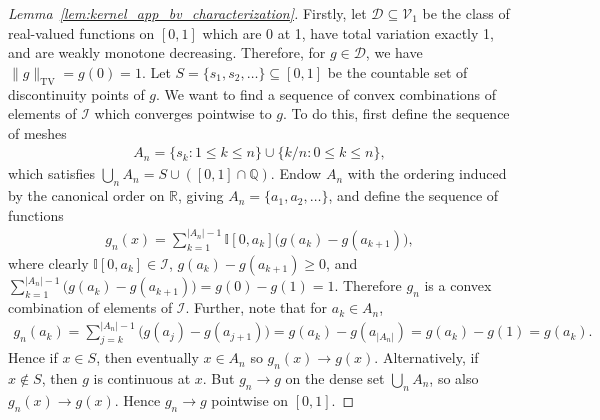 \documentclass[11pt,lof]{puthesis}
\newcommand{\R}{\ensuremath{\mathbb{R}}}
\newcommand{\Q}{\ensuremath{\mathbb{Q}}}
\newcommand{\I}{\ensuremath{\mathbb{I}}}
\newcommand{\TV}{\mathrm{TV}}
\newcommand{\cV}{\ensuremath{\mathcal{V}}}
\newcommand{\cD}{\ensuremath{\mathcal{D}}}
\newcommand{\cI}{\ensuremath{\mathcal{I}}}
\theoremstyle{break}
\theoremstyle{proof}
\newtheorem{proof}{Proof}
\begin{document}
\begin{proof}[Lemma~\ref{lem:kernel_app_bv_characterization}]

  Firstly, let $\cD \subseteq \cV_1$
  be the class of real-valued functions
  on $[0,1]$
  which are
  0 at 1,
  have total variation exactly 1,
  and are weakly monotone decreasing.
  Therefore, for $g \in \cD$, we have
  $\|g\|_\TV = g(0) = 1$.
  Let $S = \{s_1, s_2, \dots\} \subseteq [0,1]$
  be the countable set of discontinuity points of $g$.
  We want to find a sequence of
  convex combinations of elements of
  $\cI$ which converges pointwise to $g$.
  To do this, first define the sequence of meshes
  \begin{align*}
    A_n =
    \{s_k : 1 \leq k \leq n\}
    \cup
    \{k/n : 0 \leq k \leq n\},
  \end{align*}
  which satisfies
  $\bigcup_n A_n = S \cup ([0,1] \cap \Q)$.
  Endow $A_n$ with the ordering
  induced by the canonical order on $\R$,
  giving $A_n = \{a_1, a_2, \ldots\}$,
  and define the sequence of functions
  \begin{align*}
    g_n(x)
    = \sum_{k = 1}^{|A_n|-1}
    \I[0,a_k]
    \big( g(a_k) - g(a_{k+1}) \big),
  \end{align*}
  where clearly
  $\I[0, a_k] \in \cI$,
  $g(a_k) - g(a_{k+1}) \geq 0$,
  and
  $\sum_{k = 1}^{|A_n|-1}
  \big(
    g(a_k) - g(a_{k+1})
  \big)
  = g(0) - g(1) = 1$.
  Therefore $g_n$ is a convex combination of elements of $\cI$.
  Further, note that for
  $a_k \in A_n$,
  \begin{align*}
    g_n(a_k)
    = \sum_{j = k}^{|A_n|-1}
    \big( g(a_j) - g(a_{j+1}) \big)
    = g(a_k) - g(a_{|A_n|})
    = g(a_k) - g(1)
    = g(a_k).
  \end{align*}
  Hence if $x \in S$, then eventually $x \in A_n$ so $g_n(x) \to g(x)$.
  Alternatively, if $x \not\in S$, then $g$ is continuous at $x$.
  But $g_n \to g$ on the dense set $\bigcup_n A_n$,
  so also $g_n(x) \to g(x)$.
  Hence $g_n \to g$
  pointwise on $[0,1]$.


\end{proof}
\end{document}
